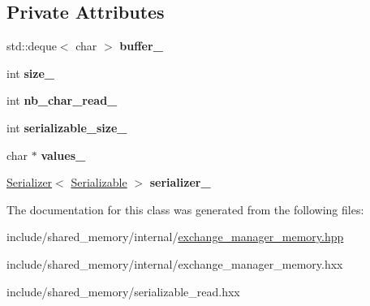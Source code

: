 \subsection*{Private Attributes}
\begin{DoxyCompactItemize}
\item 
\mbox{\label{classshared__memory_1_1internal_1_1Serialized__read_a2bf4782bcdbbf8a415309b82e9b333c6}} 
std\+::deque$<$ char $>$ {\bfseries buffer\+\_\+}
\item 
\mbox{\label{classshared__memory_1_1internal_1_1Serialized__read_acb1db67ffcae257bb009c16726abcbb7}} 
int {\bfseries size\+\_\+}
\item 
\mbox{\label{classshared__memory_1_1internal_1_1Serialized__read_ae8f179745a0e9c95668c08a092d291ee}} 
int {\bfseries nb\+\_\+char\+\_\+read\+\_\+}
\item 
\mbox{\label{classshared__memory_1_1internal_1_1Serialized__read_a540b0e3a8a12d0167b828010fd7fde3e}} 
int {\bfseries serializable\+\_\+size\+\_\+}
\item 
\mbox{\label{classshared__memory_1_1internal_1_1Serialized__read_ad267ed8416105a705c1afabd16cb941b}} 
char $\ast$ {\bfseries values\+\_\+}
\item 
\mbox{\label{classshared__memory_1_1internal_1_1Serialized__read_a507ecb659494a31ae4d4744967bcf78d}} 
\hyperlink{classshared__memory_1_1Serializer}{Serializer}$<$ \hyperlink{classSerializable}{Serializable} $>$ {\bfseries serializer\+\_\+}
\end{DoxyCompactItemize}


The documentation for this class was generated from the following files\+:\begin{DoxyCompactItemize}
\item 
include/shared\+\_\+memory/internal/\hyperlink{exchange__manager__memory_8hpp}{exchange\+\_\+manager\+\_\+memory.\+hpp}\item 
include/shared\+\_\+memory/internal/exchange\+\_\+manager\+\_\+memory.\+hxx\item 
include/shared\+\_\+memory/serializable\+\_\+read.\+hxx\end{DoxyCompactItemize}
